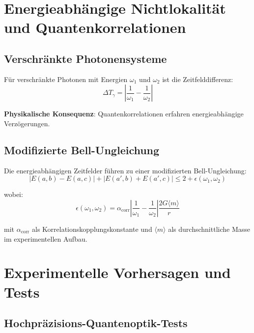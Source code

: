 \documentclass[12pt,a4paper]{article}
\begin{document}
	\section{Energieabhängige Nichtlokalität und Quantenkorrelationen}
	
	\subsection{Verschränkte Photonensysteme}
	
	Für verschränkte Photonen mit Energien $\omega_1$ und $\omega_2$ ist die Zeitfelddifferenz:
	\begin{equation}
		\Delta T_\gamma = \left|\frac{1}{\omega_1} - \frac{1}{\omega_2}\right|
		\label{eq:time_field_difference}
	\end{equation}
	
	\textbf{Physikalische Konsequenz}: Quantenkorrelationen erfahren energieabhängige Verzögerungen.
	
	\subsection{Modifizierte Bell-Ungleichung}
	
	Die energieabhängigen Zeitfelder führen zu einer modifizierten Bell-Ungleichung:
	\begin{equation}
		|E(a,b) - E(a,c)| + |E(a',b) + E(a',c)| \leq 2 + \epsilon(\omega_1, \omega_2)
		\label{eq:modified_bell_inequality}
	\end{equation}
	
	wobei:
	\begin{equation}
		\epsilon(\omega_1, \omega_2) = \alpha_{\text{corr}} \left|\frac{1}{\omega_1} - \frac{1}{\omega_2}\right| \frac{2G\langle m \rangle}{r}
		\label{eq:bell_correction}
	\end{equation}
	
	mit $\alpha_{\text{corr}}$ als Korrelationskopplungskonstante und $\langle m \rangle$ als durchschnittliche Masse im experimentellen Aufbau.
	

	\section{Experimentelle Vorhersagen und Tests}
	
	\subsection{Hochpräzisions-Quantenoptik-Tests}
	
\end{document}
